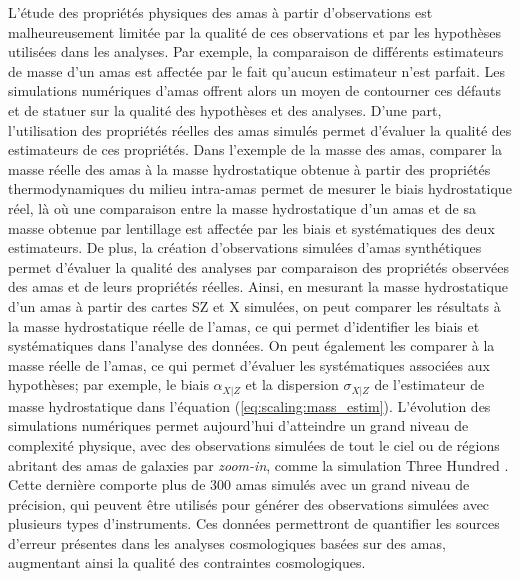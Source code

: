 L'étude des propriétés physiques des amas à partir d'observations est malheureusement limitée par la qualité de ces observations et par les hypothèses utilisées dans les analyses.
Par exemple, la comparaison de différents estimateurs de masse d'un amas est affectée par le fait qu'aucun estimateur n'est parfait.
Les simulations numériques d'amas offrent alors un moyen de contourner ces défauts et de statuer sur la qualité des hypothèses et des analyses.
D'une part, l'utilisation des propriétés réelles des amas simulés permet d'évaluer la qualité des estimateurs de ces propriétés.
Dans l'exemple de la masse des amas, comparer la masse réelle des amas à la masse hydrostatique obtenue à partir des propriétés thermodynamiques du milieu intra-amas permet de mesurer le biais hydrostatique réel, là où une comparaison entre la masse hydrostatique d'un amas et de sa masse obtenue par lentillage est affectée par les biais et systématiques des deux estimateurs.
De plus, la création d'observations simulées d'amas synthétiques permet d'évaluer la qualité des analyses par comparaison des propriétés observées des amas et de leurs propriétés réelles.
Ainsi, en mesurant la masse hydrostatique d'un amas à partir des cartes SZ et X simulées, on peut comparer les résultats à la masse hydrostatique réelle de l'amas, ce qui permet d'identifier les biais et systématiques dans l'analyse des données.
On peut également les comparer à la masse réelle de l'amas, ce qui permet d'évaluer les systématiques associées aux hypothèses; par exemple, le biais $\alpha_{X|Z}$ et la dispersion $\sigma_{X|Z}$ de l'estimateur de masse hydrostatique dans l'équation (\ref{eq:scaling:mass_estim}).
L'évolution des simulations numériques permet aujourd'hui d'atteindre un grand niveau de complexité physique, avec des observations simulées de tout le ciel \cite{lsst_dark_energy_science_collaboration_lsst_desc_lsst_2021,heitmann_last_2021} ou de régions abritant des amas de galaxies par \textit{zoom-in}, comme la simulation Three Hundred \cite{cui_three_2018}.
Cette dernière comporte plus de 300 amas simulés avec un grand niveau de précision, qui peuvent être utilisés pour générer des observations simulées avec plusieurs types d'instruments.
Ces données permettront de quantifier les sources d'erreur présentes dans les analyses cosmologiques basées sur des amas, augmentant ainsi la qualité des contraintes cosmologiques.

